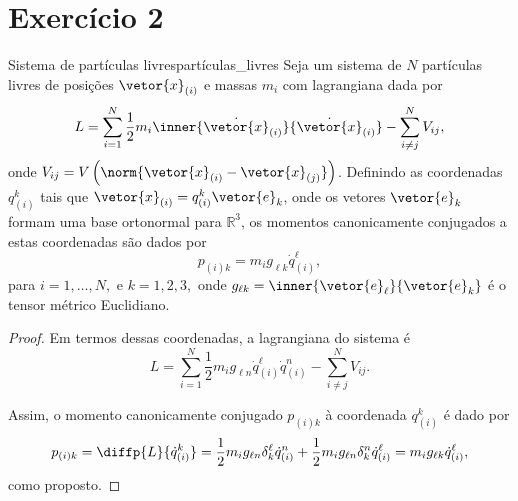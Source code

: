 \section*{Exercício 2}
\begin{lemma}{Sistema de partículas livres}{partículas_livres}
    Seja um sistema de \(N\) partículas livres de posições \(\vetor{x}_{(i)}\) e massas \(m_i\) com lagrangiana dada por
    \begin{equation*}
        L = \sum_{i = 1}^N \frac12m_i \inner{\dot{\vetor{x}}_{(i)}}{\dot{\vetor{x}}_{(i)}} - \sum_{i\neq j}^N V_{ij},
    \end{equation*}
    onde \(V_{ij} = V\left(\norm{\vetor{x}_{(i)} - \vetor{x}_{(j)}}\right)\). Definindo as coordenadas \(q_{(i)}^k\) tais que \(\vetor{x}_{(i)} = q_{(i)}^k\vetor{e}_k\), onde os vetores \(\vetor{e}_k\) formam uma base ortonormal para \(\mathbb{R}^3\), os momentos canonicamente conjugados a estas coordenadas são dados por
    \begin{equation*}
        {p}_{(i)k} = m_i g_{\ell k}\dot{q}_{(i)}^\ell,
    \end{equation*}
    para \(i = 1, \dots, N,\) e \(k = 1,2,3,\) onde \(g_{\ell k} = \inner{\vetor{e}_{\ell}}{\vetor{e}_k}\) é o tensor métrico Euclidiano.
\end{lemma}
\begin{proof}
    Em termos dessas coordenadas, a lagrangiana do sistema é
    \begin{equation*}
        L = \sum_{i = 1}^{N}\frac12 m_i g_{\ell n}\dot{q}_{(i)}^\ell \dot{q}_{(i)}^n - \sum_{i\neq j}^N V_{ij}.
    \end{equation*}

    Assim, o momento canonicamente conjugado \(p_{(i)k}\) à coordenada \(q_{(i)}^k\) é dado por
    \begin{equation*}
        p_{(i)k} = \diffp{L}{\dot{q}_{(i)}^k} = \frac12 m_i g_{\ell n} \delta^\ell_{k} \dot{q}_{(i)}^n + \frac12 m_i g_{\ell n} \delta^n_k \dot{q}_{(i)}^\ell = m_i g_{\ell k} \dot{q}_{(i)}^\ell,
    \end{equation*}
    como proposto.
\end{proof}

